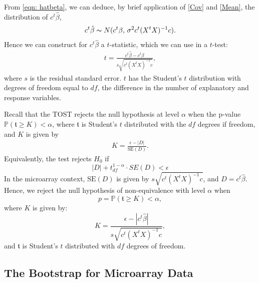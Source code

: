 From \ref{eqn: hatbeta}, we can deduce, by brief application of \ref{Cov} and  \ref{Mean},  the distribution of  $c^t \hat{\beta}$,
\begin{eqnarray}
\label{c^t beta}
c^t\hat{\beta} \thicksim N( c^t \beta, \,\sigma^2 c^t (X^tX)^{-1}c).
\end{eqnarray}
Hence we can construct for $c^t \hat{\beta}$ a $t$-statistic, which we can use in a $t$-test:
\begin{eqnarray}
t = \frac{c^t  \hat{\beta} - c^t  \beta }{ s \sqrt{ c^t (X^tX)^{-1}c} },
\end{eqnarray}
where $s$ is the residual standard error. $t$ has the Student's $t$ distribution with degrees of freedom equal to $df$, the difference in the number of explanatory and response variables. 



Recall that the TOST rejects the null hypothesis at level $\alpha$ when the p-value $ \mathbb{P}(\mathfrak{t} \geq K) < \alpha$, where $\mathfrak{t}$ is Student's $t$ distributed with the $df$ degrees if freedom, and $K $ is given by 
\begin{eqnarray}
 K = \frac {\epsilon - |D| }{\mbox{SE}(D) }.
 \end{eqnarray} 
 Equivalently, the test rejects $H_0$ if
 \[
|D| + t^{1-\alpha}_{df} \cdot SE(D) < \epsilon
\]
In the microarray context, $\mbox{SE}(D)$ is given by $s \sqrt{ c^t (X^tX)^{-1}c} $, and $D = c^t \hat{\beta}$. Hence, we reject the null hypothesis of non-equivalence with level $\alpha$ when 
\[p =   \mathbb{P}( \mathfrak{t} \geq K) < \alpha,\]
where $K$ is given by:
\[ K = \frac {\epsilon - |c^t \hat{\beta}| }{ s \sqrt{ c^t (X^tX)^{-1}c}  }, \]
and $\mathfrak{t}$ is Student's $t$ distributed with $df$ degrees of freedom.


\subsection{The Bootstrap for Microarray Data}
 
